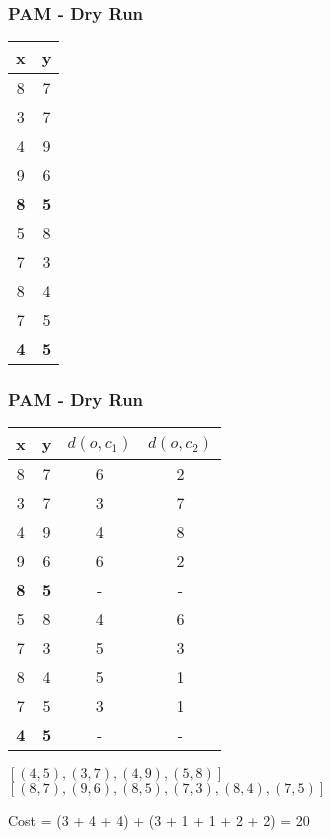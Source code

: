 \documentclass{beamer}
\begin{document}
\begin{frame}
    \frametitle{PAM - Dry Run}
    \begin{table}[h!]
        \centering
        \begin{tabular}{|c c|} 
             \hline
             x & y \\
             \hline
             8 & 7\\
             3 & 7\\
             4 & 9\\
             9 & 6\\
             \textbf 8 & \textbf 5\\
             5 & 8\\
             7 & 3\\
             8 & 4\\
             7 & 5\\
             \textbf 4 & \textbf 5\\
             \hline
        \end{tabular}
    \end{table}
\end{frame}

\begin{frame}
    \frametitle{PAM - Dry Run}
    \begin{table}[h!]
        \centering
        \begin{tabular}{|c c c c|} 
             \hline
             x & y & $d(o, c_1)$ & $d(o, c_2)$ \\
             \hline
             8 & 7 & 6 & 2\\
             3 & 7 & 3 & 7\\
             4 & 9 & 4 & 8\\
             9 & 6 & 6 & 2\\
             \textbf 8 & \textbf 5 & - & -\\
             5 & 8 & 4 & 6\\
             7 & 3 & 5 & 3\\
             8 & 4 & 5 & 1\\
             7 & 5 & 3 & 1\\
             \textbf 4 & \textbf 5 & - & -\\
             \hline
        \end{tabular}
    \end{table}
    
    \centering $[(4,5),(3,7),(4,9),(5,8)]$ \\
    \centering $[(8,7),(9,6),(8,5),(7,3),(8,4),(7,5)]$
    
    \centering Cost = (3 + 4 + 4) + (3 + 1 + 1 + 2 + 2) = 20
    
\end{frame}
\end{document}
